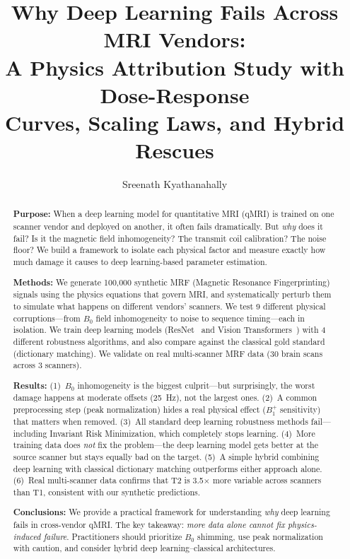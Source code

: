 \documentclass[11pt,a4paper]{article}
\title{%
  \textbf{Why Deep Learning Fails Across MRI Vendors:\\
  A Physics Attribution Study with Dose-Response\\
  Curves, Scaling Laws, and Hybrid Rescues}
}
\author{Sreenath Kyathanahally}
\date{}
\begin{document}
\maketitle

\begin{abstract}
\textbf{Purpose:}
When a deep learning model for quantitative MRI (qMRI) is trained on
one scanner vendor and deployed on another, it often fails dramatically.
But \emph{why} does it fail? Is it the magnetic field inhomogeneity? The
transmit coil calibration? The noise floor? We build a framework to
isolate each physical factor and measure exactly how much damage it
causes to deep learning-based parameter estimation.

\textbf{Methods:}
We generate 100{,}000 synthetic MRF (Magnetic Resonance Fingerprinting)
signals using the physics equations that govern MRI, and systematically
perturb them to simulate what happens on different vendors' scanners. We
test 9 different physical corruptions---from $B_0$ field inhomogeneity
to noise to sequence timing---each in isolation. We train deep learning
models (ResNet~\cite{he2016deep} and Vision
Transformers~\cite{dosovitskiy2021an}) with 4 different robustness
algorithms, and also compare against the classical gold standard
(dictionary matching). We validate on real multi-scanner MRF data
(30 brain scans across 3 scanners).

\textbf{Results:}
(1)~$B_0$ inhomogeneity is the biggest culprit---but surprisingly, the
worst damage happens at moderate offsets (25~Hz), not the largest ones.
(2)~A common preprocessing step (peak normalization) hides a real
physical effect ($B_1^+$ sensitivity) that matters when removed.
(3)~All standard deep learning robustness methods fail---including
Invariant Risk Minimization, which completely stops learning.
(4)~More training data does \emph{not} fix the problem---the deep
learning model gets better at the source scanner but stays equally bad
on the target.
(5)~A simple hybrid combining deep learning with classical dictionary
matching outperforms either approach alone.
(6)~Real multi-scanner data confirms that T2 is 3.5$\times$ more
variable across scanners than T1, consistent with our synthetic
predictions.

\textbf{Conclusions:}
We provide a practical framework for understanding \emph{why} deep
learning fails in cross-vendor qMRI. The key takeaway: \emph{more data
alone cannot fix physics-induced failure}. Practitioners should
prioritize $B_0$ shimming, use peak normalization with caution, and
consider hybrid deep learning--classical architectures.
\end{abstract}
\end{document}
